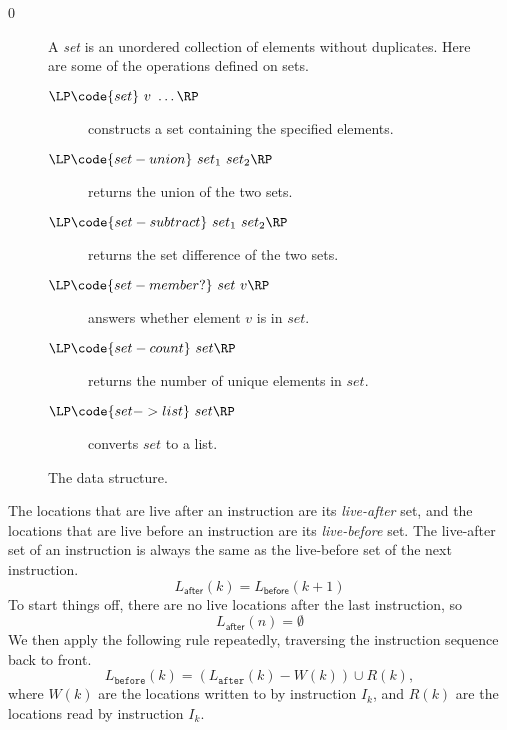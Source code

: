 \documentclass[7x10]{TimesAPriori_MIT}%
\def\racketEd{0}
\def\edition{1}
\numberwithin{theorem}{chapter}
\numberwithin{definition}{chapter}
\numberwithin{equation}{chapter}
\begin{document}
{\if\edition\racketEd
\begin{figure}[tp]
  \small
  \begin{tcolorbox}[title=\href{https://docs.racket-lang.org/reference/sets.html}{The Racket Set Package}]
    A \emph{set} is an unordered collection of elements without duplicates.
    Here are some of the operations defined on sets.
  \begin{description}
  \item[$\LP\code{set}~v~\ldots\RP$] constructs a set containing the specified elements.
  \item[$\LP\code{set-union}~set_1~set_2\RP$] returns the union of the two sets.
  \item[$\LP\code{set-subtract}~set_1~set_2\RP$] returns the set
    difference of the two sets.
  \item[$\LP\code{set-member?}~set~v\RP$] answers whether element $v$ is in $set$.
  \item[$\LP\code{set-count}~set\RP$] returns the number of unique elements in $set$.
  \item[$\LP\code{set->list}~set\RP$] converts $set$ to a list.
  \end{description}
  \end{tcolorbox}
  \caption{The  data structure.}
  \label{fig:set}
\end{figure}
\fi}


The locations that are live after an instruction are its
\emph{live-after} set, and the locations
that are live before an instruction are its
\emph{live-before} set. The live-after
set of an instruction is always the same as the live-before set of the
next instruction.
\begin{equation} \label{eq:live-after-before-next}
  L_{\mathsf{after}}(k) = L_{\mathsf{before}}(k+1)
\end{equation}
To start things off, there are no live locations after the last
instruction, so
\begin{equation}\label{eq:live-last-empty}
  L_{\mathsf{after}}(n) = \emptyset
\end{equation}
We then apply the following rule repeatedly, traversing the
instruction sequence back to front.
\begin{equation}\label{eq:live-before-after-minus-writes-plus-reads}
  L_{\mathtt{before}}(k) = (L_{\mathtt{after}}(k) - W(k)) \cup R(k),
\end{equation}
where $W(k)$ are the locations written to by instruction $I_k$, and
$R(k)$ are the locations read by instruction $I_k$.
\end{document}

